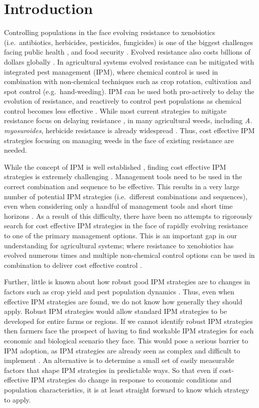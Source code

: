 \documentclass[12pt, a4paper]{article}
\begin{document}
\section*{Introduction}
Controlling populations in the face evolving resistance to xenobiotics (i.e.\ antibiotics, herbicides, pesticides, fungicides) is one of the biggest challenges facing public health \citep{Laxm2016, Willy2017}, and food security \citep{Denh1992, Palu2001, Hick2018}. Evolved resistance also costs billions of dollars globally \citep{Livi2016, Ches2018, Hick2018}. In agricultural systems evolved resistance can be mitigated with integrated pest management (IPM), where chemical control is used in combination with non-chemical techniques such as crop rotation, cultivation and spot control (e.g.\ hand-weeding). IPM can be used both pro-actively to delay the evolution of resistance, and reactively to control pest populations as chemical control becomes less effective \citep{Denh1992, Hick2018}. While most current strategies to mitigate resistance focus on delaying resistance \citep{REX2013}, in many agricultural weeds, including \textit{A. myosuroides}, herbicide resistance is already widespread \citep{Hick2018}. Thus, cost effective IPM strategies focusing on managing weeds in the face of existing resistance are needed.               

While the concept of IPM is well established \citep{Bott1979}, finding cost effective IPM strategies is extremely challenging \citep{Dana2014, Chal2015}. Management tools need to be used in the correct combination and sequence to be effective. This results in a very large number of potential IPM strategies (i.e.\ different combinations and sequences), even when considering only a handful of management tools and short time horizons \citep{Chal2015}. As a result of this difficulty, there have been no attempts to rigorously search for cost effective IPM strategies in the face of rapidly evolving resistance to one of the primary management options. This is an important gap in our understanding for agricultural systems; where resistance to xenobiotics has evolved numerous times \citep{Denh1992, Palu2001} and multiple non-chemical control options can be used in combination to deliver cost effective control \citep{Chal2015}.      

Further, little is known about how robust good IPM strategies are to changes in factors such as crop yield and pest population dynamics \citep{EpanN2010}. Thus, even when effective IPM strategies are found, we do not know how generally they should apply. Robust IPM strategies would allow standard IPM strategies to be developed for entire farms or regions. If we cannot identify robust IPM strategies then farmers face the prospect of having to find workable IPM strategies for each economic and biological scenario they face. This would pose a serious barrier to IPM adoption, as IPM strategies are already seen as complex and difficult to implement \citep{Llew2006}. An alternative is to determine a small set of easily measurable factors that shape IPM strategies in predictable ways. So that even if cost-effective IPM strategies do change in response to economic conditions and population characteristics, it is at least straight forward to know which strategy to apply.     
\end{document}
